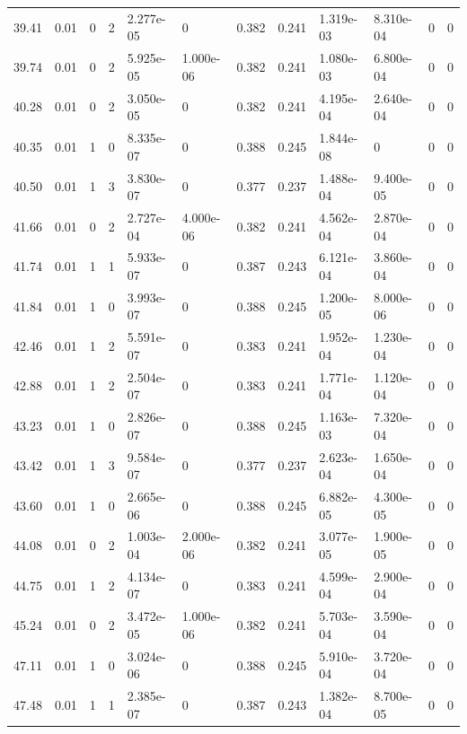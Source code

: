 \documentclass[preview]{standalone}
\begin{document}
{{{\begin{tabular}{L{1.2cm}C{1.2cm} C{0.3cm}C{0.5cm} C{1.4cm}C{1.4cm} C{1.4cm}C{1.4cm} C{1.6cm}C{1.6cm} C{1.6cm}C{1.6cm}}
  39.41  &  0.01  & 0     &  2 &  2.277e-05  & 0  &  0.382&   0.241& 1.319e-03 & 8.310e-04   &  0 & 0  \\ 
  39.74  &  0.01  & 0     &  2 &  5.925e-05  & 1.000e-06  &  0.382&   0.241& 1.080e-03 & 6.800e-04   &  0 & 0  \\ 
  40.28  &  0.01  & 0     &  2 &  3.050e-05  & 0  &  0.382&   0.241& 4.195e-04 & 2.640e-04   &  0 & 0  \\ 
  40.35  &  0.01  & 1     &  0 &  8.335e-07  & 0  &  0.388&   0.245& 1.844e-08 & 0   &  0 & 0  \\ 
  40.50  &  0.01  & 1     &  3 &  3.830e-07  & 0  &  0.377&   0.237& 1.488e-04 & 9.400e-05   &  0 & 0  \\ 
  41.66  &  0.01  & 0     &  2 &  2.727e-04  & 4.000e-06  &  0.382&   0.241& 4.562e-04 & 2.870e-04   &  0 & 0  \\ 
  41.74  &  0.01  & 1     &  1 &  5.933e-07  & 0  &  0.387&   0.243& 6.121e-04 & 3.860e-04   &  0 & 0  \\ 
  41.84  &  0.01  & 1     &  0 &  3.993e-07  & 0  &  0.388&   0.245& 1.200e-05 & 8.000e-06   &  0 & 0  \\ 
  42.46  &  0.01  & 1     &  2 &  5.591e-07  & 0  &  0.383&   0.241& 1.952e-04 & 1.230e-04   &  0 & 0  \\ 
  42.88  &  0.01  & 1     &  2 &  2.504e-07  & 0  &  0.383&   0.241& 1.771e-04 & 1.120e-04   &  0 & 0  \\ 
  43.23  &  0.01  & 1     &  0 &  2.826e-07  & 0  &  0.388&   0.245& 1.163e-03 & 7.320e-04   &  0 & 0  \\ 
  43.42  &  0.01  & 1     &  3 &  9.584e-07  & 0  &  0.377&   0.237& 2.623e-04 & 1.650e-04   &  0 & 0  \\ 
  43.60  &  0.01  & 1     &  0 &  2.665e-06  & 0  &  0.388&   0.245& 6.882e-05 & 4.300e-05   &  0 & 0  \\ 
  44.08  &  0.01  & 0     &  2 &  1.003e-04  & 2.000e-06  &  0.382&   0.241& 3.077e-05 & 1.900e-05   &  0 & 0  \\ 
  44.75  &  0.01  & 1     &  2 &  4.134e-07  & 0  &  0.383&   0.241& 4.599e-04 & 2.900e-04   &  0 & 0  \\ 
  45.24  &  0.01  & 0     &  2 &  3.472e-05  & 1.000e-06  &  0.382&   0.241& 5.703e-04 & 3.590e-04   &  0 & 0  \\ 
  47.11  &  0.01  & 1     &  0 &  3.024e-06  & 0  &  0.388&   0.245& 5.910e-04 & 3.720e-04   &  0 & 0  \\ 
  47.48  &  0.01  & 1     &  1 &  2.385e-07  & 0  &  0.387&   0.243& 1.382e-04 & 8.700e-05   &  0 & 0  \\ 

\end{tabular}}}}
\end{document}
